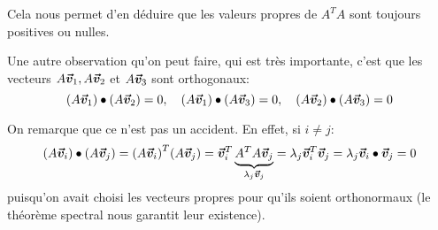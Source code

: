 \documentclass[a4paper]{article}
\begin{document}
{    Cela nous permet d'en déduire que les valeurs propres de $A^T A$ sont toujours positives ou nulles.

    Une autre observation qu'on peut faire, qui est très importante, c'est que les vecteurs $A \bm{\protect\vec{v}}_1, A \bm{\protect\vec{v}}_2$ et $A \bm{\protect\vec{v}}_3$ sont orthogonaux:
    \[\left(A \bvec{v}_1\right) \dotprod \left(A \bvec{v}_2\right) = 0, \mathspace \left(A \bvec{v}_1\right) \dotprod \left(A \bvec{v}_3\right) = 0, \mathspace \left(A \bvec{v}_2\right) \dotprod \left(A \bvec{v}_3\right) =  0\]

    On remarque que ce n'est pas un accident. En effet, si $i \neq j$:
    \[\left(A \bvec{v}_i\right) \dotprod \left(A \bvec{v}_j\right) = \left(A \bvec{v}_i\right)^T \left(A \bvec{v}_j\right) = \bvec{v}_i^T \underbrace{A^T A \bvec{v}_j}_{\lambda_j \bvec{v}_j} = \lambda_j \bvec{v}_i^T \bvec{v}_j = \lambda_j \bvec{v}_i \dotprod \bvec{v}_j = 0\]
    puisqu'on avait choisi les vecteurs propres pour qu'ils soient orthonormaux (le théorème spectral nous garantit leur existence).

}
\end{document}
